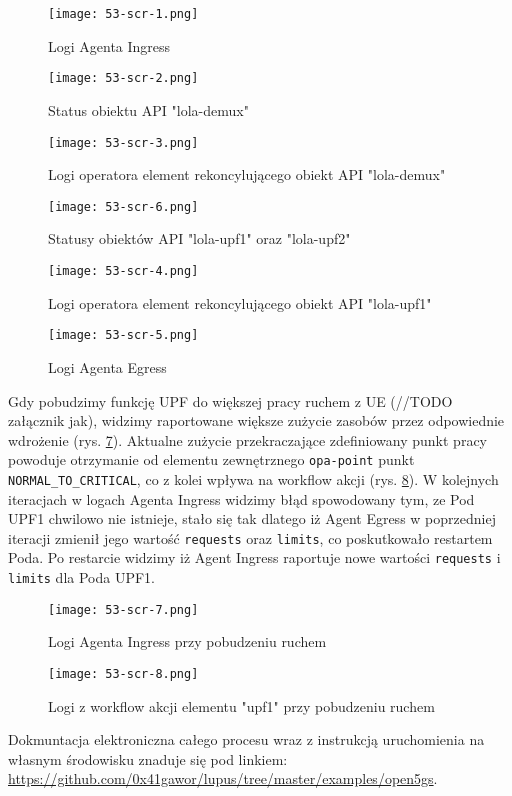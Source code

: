 \begin{figure}[!h]
    \centering \texttt{[image: 53-scr-1.png]}
    \caption{Logi Agenta Ingress}\label{fig:53-scr-1}
\end{figure}

\begin{figure}[!h]
    \centering \texttt{[image: 53-scr-2.png]}
    \caption{Status obiektu API "lola-demux"}\label{fig:53-scr-2}
\end{figure}

\begin{figure}[!h]
    \centering \texttt{[image: 53-scr-3.png]}
    \caption{Logi operatora element rekoncylującego obiekt API "lola-demux"}\label{fig:53-scr-3}
\end{figure}

\begin{figure}[!h]
    \centering \texttt{[image: 53-scr-6.png]}
    \caption{Statusy obiektów API "lola-upf1" oraz "lola-upf2"}\label{fig:53-scr-6}
\end{figure}

\begin{figure}[!h]
    \centering \texttt{[image: 53-scr-4.png]}
    \caption{Logi operatora element rekoncylującego obiekt API "lola-upf1"}\label{fig:53-scr-4}
\end{figure}

\begin{figure}[!h]
    \centering \texttt{[image: 53-scr-5.png]}
    \caption{Logi Agenta Egress}\label{fig:53-scr-5}
\end{figure}

Gdy pobudzimy funkcję UPF do większej pracy ruchem z UE (//TODO załącznik jak), widzimy raportowane większe zużycie zasobów przez odpowiednie wdrożenie (rys. \ref{fig:53-scr-7}). Aktualne zużycie przekraczające zdefiniowany punkt pracy powoduje otrzymanie od elementu zewnętrznego \texttt{opa-point} punkt \texttt{NORMAL\_TO\_CRITICAL}, co z kolei wpływa na workflow akcji (rys. \ref{fig:53-scr-8}). W kolejnych iteracjach w logach Agenta Ingress widzimy błąd spowodowany tym, ze Pod UPF1 chwilowo nie istnieje, stało się tak dlatego iż Agent Egress w poprzedniej iteracji zmienił jego wartość \texttt{requests} oraz \texttt{limits}, co poskutkowało restartem Poda. Po restarcie widzimy iż Agent Ingress raportuje nowe wartości \texttt{requests} i \texttt{limits} dla Poda UPF1.

\begin{figure}[!h]
    \centering \texttt{[image: 53-scr-7.png]}
    \caption{Logi Agenta Ingress przy pobudzeniu ruchem}\label{fig:53-scr-7}
\end{figure}

\begin{figure}[!h]
    \centering \texttt{[image: 53-scr-8.png]}
    \caption{Logi z workflow akcji elementu "upf1" przy pobudzeniu ruchem}\label{fig:53-scr-8}
\end{figure}

Dokmuntacja elektroniczna całego procesu wraz z instrukcją uruchomienia na własnym środowisku znaduje się pod linkiem: \url{https://github.com/0x41gawor/lupus/tree/master/examples/open5gs}.